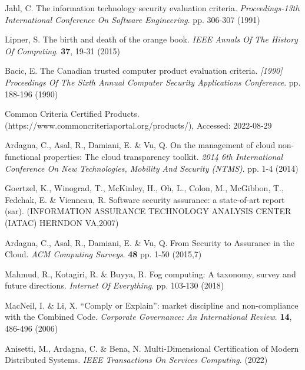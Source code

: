 Jahl, C. The information technology security evaluation criteria. {\em Proceedings-13th International Conference On Software Engineering}. pp. 306-307 (1991)

Lipner, S. The birth and death of the orange book. {\em IEEE Annals Of The History Of Computing}. \textbf{37}, 19-31 (2015)

Bacic, E. The Canadian trusted computer product evaluation criteria. {\em [1990] Proceedings Of The Sixth Annual Computer Security Applications Conference}. pp. 188-196 (1990)

Common Criteria Certified Products. (https://www.commoncriteriaportal.org/products/), Accessed: 2022-08-29

Ardagna, C., Asal, R., Damiani, E. \& Vu, Q. On the management of cloud non-functional properties: The cloud transparency toolkit. {\em 2014 6th International Conference On New Technologies, Mobility And Security (NTMS)}. pp. 1-4 (2014)

Goertzel, K., Winograd, T., McKinley, H., Oh, L., Colon, M., McGibbon, T., Fedchak, E. \& Vienneau, R. Software security assurance: a state-of-art report (sar). (INFORMATION ASSURANCE TECHNOLOGY ANALYSIS CENTER (IATAC) HERNDON VA,2007)

Ardagna, C., Asal, R., Damiani, E. \& Vu, Q. From Security to Assurance in the Cloud. {\em ACM Computing Surveys}. \textbf{48} pp. 1-50 (2015,7)

Mahmud, R., Kotagiri, R. \& Buyya, R. Fog computing: A taxonomy, survey and future directions. {\em Internet Of Everything}. pp. 103-130 (2018)

MacNeil, I. \& Li, X. “Comply or Explain”: market discipline and non-compliance with the Combined Code. {\em Corporate Governance: An International Review}. \textbf{14}, 486-496 (2006)

Anisetti, M., Ardagna, C. \& Bena, N. Multi-Dimensional Certification of Modern Distributed Systems. {\em IEEE Transactions On Services Computing}. (2022)


